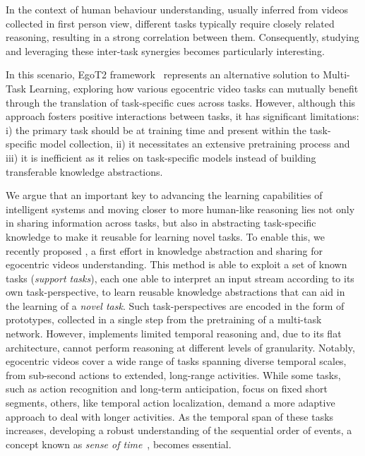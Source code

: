 In the context of human behaviour understanding, usually inferred from videos collected in first person view, different tasks typically require closely related reasoning, resulting in a strong correlation between them. Consequently, studying and leveraging these inter-task synergies becomes particularly interesting.

\IEEEpubidadjcol
In this scenario, EgoT2 framework~\cite{egot2} represents an alternative solution to Multi-Task Learning, exploring how various egocentric video tasks can mutually benefit through the translation of task-specific cues across tasks.
However, although this approach fosters positive interactions between tasks, it has significant limitations: i) the primary task should be  at training time and present within the task-specific model collection, ii) it necessitates an extensive pretraining process and iii) it is inefficient as it relies on task-specific models instead of building transferable knowledge abstractions.

We argue that an important key to advancing the learning capabilities of intelligent systems and moving closer to more human-like reasoning lies not only in sharing information across tasks, but also in abstracting task-specific knowledge to make it reusable for learning novel tasks.
To enable this, we recently proposed \ourscvpr \cite{egopack}, a first effort in knowledge abstraction and sharing for egocentric videos understanding.
This method is able to exploit a set of known tasks (\emph{support tasks}), each one able to interpret an input stream according to its own task-perspective, to learn reusable knowledge abstractions that can aid in the learning of a \emph{novel task}. Such task-perspectives are encoded in the form of prototypes, collected in a single step from the pretraining of a multi-task network.
However, \ourscvpr implements limited temporal reasoning and, due to its flat architecture, cannot perform reasoning at different levels of granularity.
Notably, egocentric videos cover a wide range of tasks spanning diverse temporal scales, from sub-second actions to extended, long-range activities. While some tasks, such as action recognition and long-term anticipation, focus on fixed short segments, others, like temporal action localization, demand a more adaptive approach to deal with longer activities. As the temporal span of these tasks increases, developing a robust understanding of the sequential order of events, a concept known as \emph{sense of time}~\cite{bagad2023test}, becomes essential.

